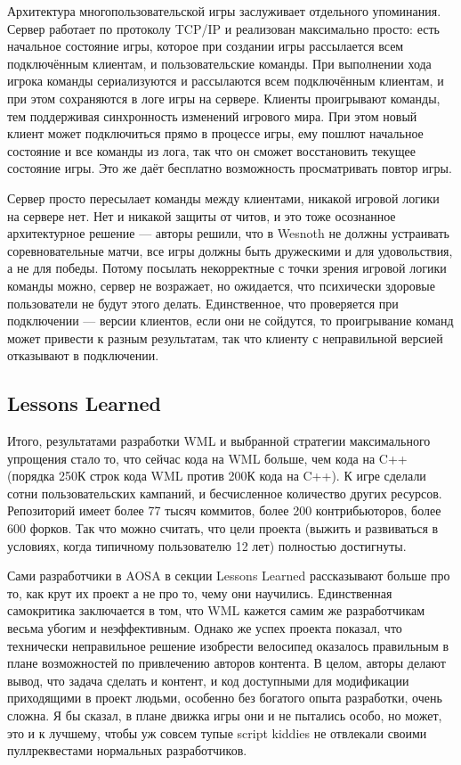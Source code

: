 \documentclass[a5paper]{article}
\begin{document}
Архитектура многопользовательской игры заслуживает отдельного упоминания. Сервер работает по протоколу TCP/IP и реализован максимально просто: есть начальное состояние игры, которое при создании игры рассылается всем подключённым клиентам, и пользовательские команды. При выполнении хода игрока команды сериализуются и рассылаются всем подключённым клиентам, и при этом сохраняются в логе игры на сервере. Клиенты проигрывают команды, тем поддерживая синхронность изменений игрового мира. При этом новый клиент может подключиться прямо в процессе игры, ему пошлют начальное состояние и все команды из лога, так что он сможет восстановить текущее состояние игры. Это же даёт бесплатно возможность просматривать повтор игры.

Сервер просто пересылает команды между клиентами, никакой игровой логики на сервере нет. Нет и никакой защиты от читов, и это тоже осознанное архитектурное решение --- авторы решили, что в Wesnoth не должны устраивать соревновательные матчи, все игры должны быть дружескими и для удовольствия, а не для победы. Потому посылать некорректные с точки зрения игровой логики команды можно, сервер не возражает, но ожидается, что психически здоровые пользователи не будут этого делать. Единственное, что проверяется при подключении --- версии клиентов, если они не сойдутся, то проигрывание команд может привести к разным результатам, так что клиенту с неправильной версией отказывают в подключении.

\subsection{Lessons Learned}

Итого, результатами разработки WML и выбранной стратегии максимального упрощения стало то, что сейчас кода на WML больше, чем кода на C++ (порядка 250К строк кода WML против 200К кода на C++). К игре сделали сотни пользовательских кампаний, и бесчисленное количество других ресурсов. Репозиторий имеет более 77 тысяч коммитов, более 200 контрибьюторов, более 600 форков. Так что можно считать, что цели проекта (выжить и развиваться в условиях, когда типичному пользователю 12 лет) полностью достигнуты. 

Сами разработчики в AOSA в секции Lessons Learned рассказывают больше про то, как крут их проект а не про то, чему они научились. Единственная самокритика заключается в том, что WML кажется самим же разработчикам весьма убогим и неэффективным. Однако же успех проекта показал, что технически неправильное решение изобрести велосипед оказалось правильным в плане возможностей по привлечению авторов контента. В целом, авторы делают вывод, что задача сделать и контент, и код доступными для модификации приходящими в проект людьми, особенно без богатого опыта разработки, очень сложна. Я бы сказал, в плане движка игры они и не пытались особо, но может, это и к лучшему, чтобы уж совсем тупые script kiddies не отвлекали своими пуллреквестами нормальных разработчиков.
\end{document}
